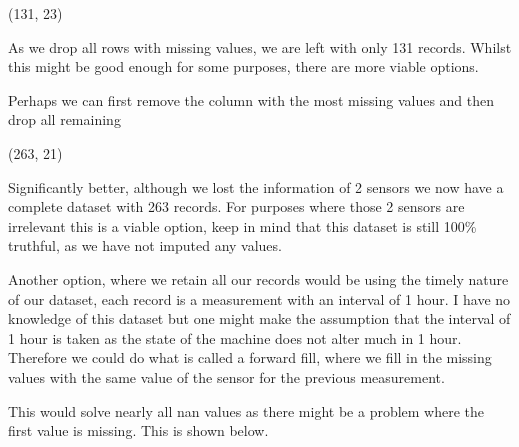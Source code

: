 \documentclass[letterpaper,10pt,english]{jupyterBook}
\begin{document}
\begin{sphinxVerbatim}[commandchars=\\\{\}]
(131, 23)
\end{sphinxVerbatim}

\sphinxAtStartPar
As we drop all rows with missing values, we are left with only 131 records.
Whilst this might be good enough for some purposes, there are more viable options.

\sphinxAtStartPar
Perhaps we can first remove the column with the most missing values and then drop all remaining

\begin{sphinxVerbatim}[commandchars=\\\{\}]
\PYG{p}{[}\PYG{p}{]}
\end{sphinxVerbatim}

\begin{sphinxVerbatim}[commandchars=\\\{\}]
(263, 21)
\end{sphinxVerbatim}

\sphinxAtStartPar
Significantly better, although we lost the information of 2 sensors we now have a complete dataset with 263 records. For purposes where those 2 sensors are irrelevant this is a viable option, keep in mind that this dataset is still 100\% truthful, as we have not imputed any values.

\sphinxAtStartPar
Another option, where we retain all our records would be using the timely nature of our dataset, each record is a measurement with an interval of 1 hour. I have no knowledge of this dataset but one might make the assumption that the interval of 1 hour is taken as the state of the machine does not alter much in 1 hour. Therefore we could do what is called a forward fill, where we fill in the missing values with the same value of the sensor for the previous measurement.

\sphinxAtStartPar
This would solve nearly all nan values as there might be a problem where the first value is missing. This is shown below.

\begin{sphinxVerbatim}[commandchars=\\\{\}]
\PYG{p}{[}\PYG{p}{]}
\end{sphinxVerbatim}
\end{document}
